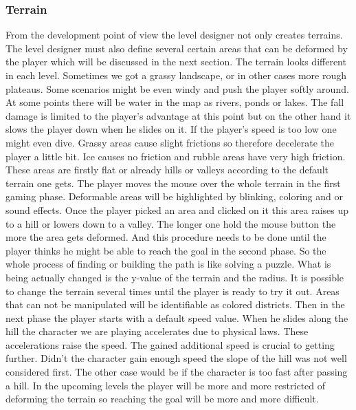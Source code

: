 \documentclass[12pt, letterpaper]{scrartcl}
\begin{document}
	\subsubsection{Terrain}
	From the development point of view the level designer not only creates terrains. The level designer must also define several certain areas that can be deformed by the player which will be discussed in the next section. The terrain looks different in each level. Sometimes we got a grassy landscape, or in other cases more rough plateaus. Some scenarios might be even windy and push the player softly around. At some points there will be water in the map as rivers, ponds or lakes. The fall damage is limited to the player's advantage at this point but on the other hand it slows the player down when he slides on it. If the player's speed is too low one might even dive. Grassy areas cause slight frictions so therefore decelerate the player a little bit. Ice causes no friction and rubble areas have very high friction.
	These areas are firstly flat or already hills or valleys according to the default terrain one gets. The player moves the mouse over the whole terrain in the first gaming phase. Deformable areas will be highlighted by blinking, coloring and or sound effects. Once the player picked an area and clicked on it this area raises up to a hill or lowers down to a valley. The longer one hold the mouse button the more the area gets deformed. And this procedure needs to be done until the player thinks he might be able to reach the goal in the second phase. So the whole process of finding or building the path is like solving a puzzle.
	What is being actually changed is the y-value of the terrain and the radius.
	It is possible to change the terrain several times until the player is ready to try it out. Areas that can not be manipulated will be identifiable as colored districts.
	Then in the next phase the player starts with a default speed value. When he slides along the hill the character we are playing accelerates due to physical laws. These accelerations raise the speed. The gained additional speed is crucial to getting further. Didn't the character gain enough speed the slope of the hill was not well considered first. The other case would be if the character is too fast after passing a hill.
	In the upcoming levels the player will be more and more restricted of deforming the terrain so reaching the goal will be more and more difficult.
	
\end{document}
